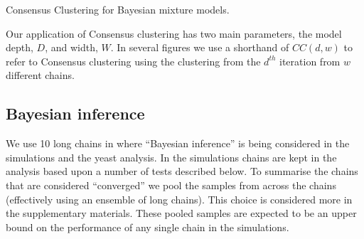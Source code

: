 \documentclass{bioinfo}
\begin{document}
\begin{methods}
\begin{algorithm} \label{algorithm:CCforBayesianMixtures}
	\caption{Consensus Clustering for Bayesian mixture models. }
\end{algorithm}

Our application of Consensus clustering has two main parameters, the model depth, $D$, and width, $W$. In several figures we use a shorthand of $CC(d, w)$ to refer to Consensus clustering using the clustering from the $d^{th}$ iteration from $w$ different chains.

\subsection{Bayesian inference}
We use 10 long chains in where ``Bayesian inference'' is being considered in the simulations and the yeast analysis. In the simulations chains are kept in the analysis based upon a number of tests described below. To summarise the chains that are considered ``converged'' we pool the samples from across the chains (effectively using an ensemble of long chains). This choice is considered more in the supplementary materials. These pooled samples are expected to be an upper bound on the performance of any single chain in the simulations.


\end{methods}
\end{document}
